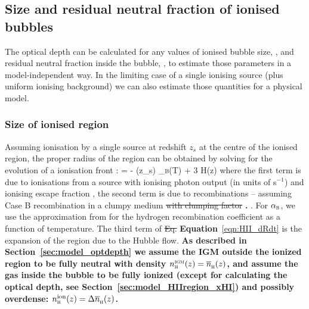 \documentclass[fleqn,usenatbib]{mnras}
\providecommand{\DIFadd}[1]{{\protect\color{Green} {\bf #1}}} %
\providecommand{\DIFdel}[1]{{\protect\color{Gray} \scriptsize \sout{#1}}} %
\providecommand{\DIFaddbegin}{} %
\providecommand{\DIFaddend}{} %
\providecommand{\DIFdelbegin}{} %
\providecommand{\DIFdelend}{} %
\newcommand{\DIFscaledelfig}{0.5}
\newlength{\DIFdelgraphicswidth} %
\newlength{\DIFdelgraphicsheight} %
\newcommand{\DIFaddincludegraphics}[2][]{{\color{purple}\fbox{\DIFOincludegraphics[#1]{#2}}}} %
\newcommand{\DIFdelincludegraphics}[2][]{%
\sbox{\DIFdelgraphicsbox}{\DIFOincludegraphics[#1]{#2}}%
\settoboxwidth{\DIFdelgraphicswidth}{\DIFdelgraphicsbox} %
\settoboxtotalheight{\DIFdelgraphicsheight}{\DIFdelgraphicsbox} %
\scalebox{\DIFscaledelfig}{%
\parbox[b]{\DIFdelgraphicswidth}{\usebox{\DIFdelgraphicsbox}\\[-\baselineskip] \rule{\DIFdelgraphicswidth}{0em}}\llap{\resizebox{\DIFdelgraphicswidth}{\DIFdelgraphicsheight}{%
\setlength{\unitlength}{\DIFdelgraphicswidth}%
\begin{picture}(1,1)%
\thicklines\linethickness{2pt} %
{\color[rgb]{1,0,0}\put(0,0){\framebox(1,1){}}}%
{\color[rgb]{1,0,0}\put(0,0){\line( 1,1){1}}}%
{\color[rgb]{1,0,0}\put(0,1){\line(1,-1){1}}}%
\end{picture}%
}\hspace*{3pt}}} %
} %
\DeclareRobustCommand{\DIFaddbegin}{\DIFOaddbegin \let\includegraphics\DIFaddincludegraphics} %
\DeclareRobustCommand{\DIFaddend}{\DIFOaddend \let\includegraphics\DIFOincludegraphics} %
\DeclareRobustCommand{\DIFdelbegin}{\DIFOdelbegin \let\includegraphics\DIFdelincludegraphics} %
\DeclareRobustCommand{\DIFdelend}{\DIFOaddend \let\includegraphics\DIFOincludegraphics} %
\begin{document}
\subsection{Size and residual neutral fraction of ionised bubbles}
\label{sec:model_HIIregion}

The optical depth can be calculated for any values of ionised bubble size, \Rion, and residual neutral fraction inside the bubble, \xHI, to estimate those parameters in a model-independent way. In the limiting case of a single ionising source (plus uniform ionising background) we can also estimate those quantities for a physical model.

\subsubsection{Size of ionised region}
\label{sec:model_HIIregion_R}

Assuming ionisation by a single source at redshift $z_s$ at the centre of the ionised region, the proper radius of the region can be obtained by solving for the evolution of a ionisation front \citep[e.g,][]{Shapiro1987,Cen2000,Yajima2018}:
%
\BE \label{eqn:HII_dRdt}
 =  - \clump \DIFaddbegin \DIFadd{\Delta }\DIFaddend \nh(z_s) \alpha_\textsc{b}(T) \Rion[3] + 3 H(z) \Rion[3]
\EE
%
where the first term is due to ionisations from a source with ionising photon output \Nion (in units of s$^{-1}$) and ionising escape fraction \fesc, the second term is due to recombinations -- assuming Case B recombination in a clumpy medium\DIFdelbegin \DIFdel{with clumping factor }\DIFdelend \DIFaddbegin \DIFadd{. }\DIFaddend \clump \DIFaddbegin \DIFadd{is the clumping factor of ionised hydrogen, which describes the enhanced rate of recombinations relative to a uniform medium, $\clump \equiv \langle n_\HII^2\rangle / \bar n_\HII^2$}\DIFaddend . For $\alpha_\textsc{b}$, we use the approximation from \citet{Hui1997} for the hydrogen recombination coefficient as a function of temperature. The third term of \DIFdelbegin \DIFdel{Eq.}\DIFdelend \DIFaddbegin \DIFadd{Equation}\DIFaddend ~\eqref{eqn:HII_dRdt} is the expansion of the region due to the Hubble flow. \DIFaddbegin \DIFadd{As described in Section~\ref{sec:model_optdepth} we assume the IGM outside the ionized region to be fully neutral with density $n_\textsc{h}^\textsc{igm}(z) = \nh(z)$, and assume the gas inside the bubble to be fully ionized (except for calculating the optical depth, see Section~\ref{sec:model_HIIregion_xHI}) and possibly overdense: $n_\textsc{h}^\mathrm{ion}(z) = \Delta \nh(z)$.
}\DIFaddend 
\end{document}
